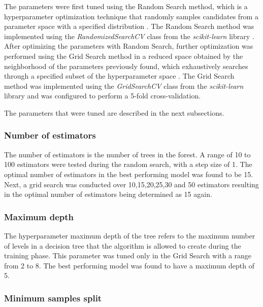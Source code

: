 \documentclass[conference]{IEEEtran}
\begin{document}
        The parameters were first tuned using the Random Search method, which is a hyperparameter optimization technique that randomly samples candidates from a parameter 
        space with a specified distribution \cite{Bergstra2012}. The Random Search method was implemented using the 
        \textit{RandomizedSearchCV} class from the \textit{scikit-learn} library \cite{scikit-learn}. After optimizing the
        parameters with Random Search, further optimization was performed using the Grid Search method in a reduced space
        obtained by the neighborhood of the parameters previously found, which exhaustively searches through a specified
        subset of the hyperparameter space \cite{Bergstra2012}. The Grid Search method was implemented using the
        \textit{GridSearchCV} class from the \textit{scikit-learn} library \cite{scikit-learn} and was configured to perform a
        5-fold cross-validation.
        
        The parameters that were tuned are described in the next subsections.        
    
        \subsubsection{Number of estimators}
    
            The number of estimators is the number of trees in the forest. A range of 10 to 100 estimators were tested during the
            random search, with a step size of 1. The optimal number of estimators in the best performing model was found to be 15.
            Next, a grid search was conducted over 10,15,20,25,30 and 50 estimators resulting in the optimal number of estimators
            being determined as 15 again.
               
        \subsubsection{Maximum depth}
    
            The hyperparameter maximum depth of the tree refers to the maximum number of levels in a decision tree that
            the algorithm is allowed to create during the training phase. This parameter was tuned only in the Grid Search
            with a range from 2 to 8. The best performing model was found to have a maximum depth of 5. 
        
        \subsubsection{Minimum samples split}
        
\end{document}
